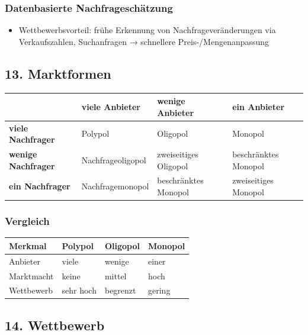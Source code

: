 \documentclass[11pt, a4paper]{article}
\begin{document}
\subsubsection{Datenbasierte Nachfrageschätzung}
\begin{itemize}
  \item Wettbewerbsvorteil: frühe Erkennung von Nachfrageveränderungen via Verkaufszahlen, Suchanfragen → schnellere Preis-/Mengenanpassung
\end{itemize}


\subsection{13. Marktformen}


{\small
\begin{tabularx}{\linewidth}{XXXX}
\hline
\rowcolor{tableheadbg}
{\color{white}\textbf{}} & {\color{white}\textbf{viele Anbieter}} & {\color{white}\textbf{wenige Anbieter}} & {\color{white}\textbf{ein Anbieter}} \\[2pt]
\hline
\endhead
\hline
\endfoot
\textbf{viele Nachfrager} & Polypol & Oligopol & Monopol \\
\textbf{wenige Nachfrager} & Nachfrageoligopol & zweiseitiges Oligopol & beschränktes Monopol \\
\textbf{ein Nachfrager} & Nachfragemonopol & beschränktes Monopol & zweiseitiges Monopol \\
\end{tabularx}
}



\subsubsection{Vergleich}

{\small
\begin{tabularx}{\linewidth}{XXXX}
\hline
\rowcolor{tableheadbg}
{\color{white}\textbf{Merkmal}} & {\color{white}\textbf{Polypol}} & {\color{white}\textbf{Oligopol}} & {\color{white}\textbf{Monopol}} \\[2pt]
\hline
\endhead
\hline
\endfoot
Anbieter & viele & wenige & einer \\
Marktmacht & keine & mittel & hoch \\
Wettbewerb & sehr hoch & begrenzt & gering \\
\end{tabularx}
}



\subsection{14. Wettbewerb}
\end{document}
